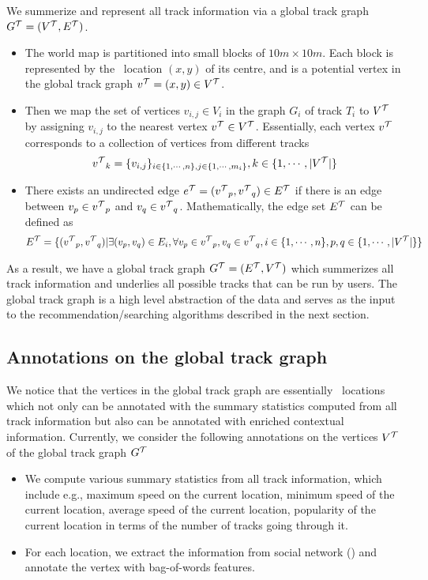 We summerize and represent all track information via a global track graph ${G^{\mathcal{T}}}=({V^{\mathcal{T}}},{E^{\mathcal{T}}})$.
\begin{itemize}
	\item The world map is partitioned into small blocks of $10m\times10m$. Each block is represented by the \gps\ location $(x,y)$ of its centre, and is a potential vertex in the global track graph ${v^{\mathcal{T}}}=(x,y)\in{V^{\mathcal{T}}}$. 
	\item Then we map the set of vertices $v_{i,j}\in V_i$ in the graph $G_i$ of track $T_i$ to ${V^{\mathcal{T}}}$ by assigning $v_{i,j}$ to the nearest vertex ${v^{\mathcal{T}}}\in{V^{\mathcal{T}}}$. Essentially, each vertex ${v^{\mathcal{T}}}$ corresponds to a collection of vertices from different tracks
	\begin{align*}
		{v^{\mathcal{T}}}_k = \{v_{i,j}\}_{i\in\{1,\cdots,n\}, j\in\{1,\cdots,m_i\}}, k\in\{1,\cdots,|{V^{\mathcal{T}}}|\}
	\end{align*}
	\item There exists an undirected edge ${e^{\mathcal{T}}}=({v^{\mathcal{T}}}_p,{v^{\mathcal{T}}}_q)\in{E^{\mathcal{T}}}$ if there is an edge between $v_p\in{v^{\mathcal{T}}}_p$ and $v_q\in{v^{\mathcal{T}}}_q$. Mathematically, the edge set ${E^{\mathcal{T}}}$ can be defined as
	\begin{align*}
		{E^{\mathcal{T}}} = \{({v^{\mathcal{T}}}_p,{v^{\mathcal{T}}}_q)|\exists (v_p,v_q)\in E_i, \forall v_p\in{v^{\mathcal{T}}}_p,v_q\in{v^{\mathcal{T}}}_q, i\in\{1,\cdots,n\},p,q\in\{1,\cdots,|{V^{\mathcal{T}}}|\}\}
	\end{align*}
\end{itemize}

As a result, we have a global track graph ${G^{\mathcal{T}}}=({E^{\mathcal{T}}},{V^{\mathcal{T}}})$ which summerizes all track information and underlies all possible tracks that can be run by users.
The global track graph is a high level abstraction of the data and serves as the input to the recommendation/searching algorithms described in the next section. 

\subsection{Annotations on the global track graph}

We notice that the vertices in the global track graph are essentially \gps\ locations which not only can be annotated with the summary statistics computed from all track information but also can be annotated with enriched contextual information. 
Currently, we consider the following annotations on the vertices ${V^{\mathcal{T}}}$ of the global track graph ${G^{\mathcal{T}}}$
\begin{itemize}
	\item We compute various summary statistics from all track information, which include e.g., maximum speed on the current location, minimum speed of the current location, average speed of the current location, popularity of the current location in terms of the number of tracks going through it.
	\item For each location, we extract the information from social network (\twitter) and annotate the vertex with bag-of-words features. 
\end{itemize}


